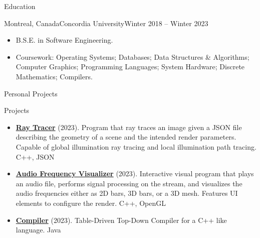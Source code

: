 \documentclass[]{mcdowellcv}
\begin{document}
	\begin{cvsection}{Education}
		\begin{cvsubsection}{Montreal, Canada}{Concordia University}{Winter 2018 -- Winter 2023}
			\begin{itemize}
				\item B.S.E. in Software Engineering.
                \item Coursework: Operating Systems; Databases; Data Structures \& Algorithms; Computer Graphics; Programming Languages; System Hardware; Discrete Mathematics; Compilers.
			\end{itemize}
		\end{cvsubsection}
	\end{cvsection}
	
	\begin{cvsection}{Personal Projects}
		\begin{cvsubsection}{Projects}{}{}
			\begin{itemize}
				\item \textbf{\href{https://github.com/adrientremblay/RayTracer}{Ray Tracer}} (2023). Program that ray traces an image given a JSON file describing the geometry of a scene and the intended render parameters. Capable of global illumination ray tracing and local illumination path tracing. C++, JSON 
                \item \textbf{\href{https://github.com/adrientremblay/AudioVisualizer}{Audio Frequency Visualizer}} (2023). Interactive visual program that plays an audio file, performs signal processing on the stream, and visualizes the audio frequencies either as 2D bars, 3D bars, or a 3D mesh. Features UI elements to configure the render. C++, OpenGL 
                \item \textbf{\href{https://github.com/adrientremblay/Compiler}{Compiler}} (2023). Table-Driven Top-Down Compiler for a C++ like language. Java
			\end{itemize}
		\end{cvsubsection}
	\end{cvsection}
	
\end{document}
